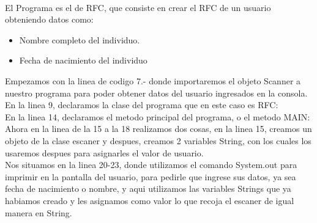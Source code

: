 \documentclass{report}%
\begin{document}
\\
{\small
El Programa es el de RFC, que consiste en crear el RFC de un usuario obteniendo datos como:\\
\begin{itemize}
  \item Nombre completo del individuo.
  \item Fecha de nacimiento del individuo
\end{itemize}

Empezamos con la linea de codigo 7.- donde importaremos el objeto Scanner a nuestro programa para poder obtener datos del usuario ingresados en la consola.\\


En la linea 9, declaramos la clase del programa que en este caso es RFC:\\


En la linea 14, declaramos el metodo principal del programa, o el metodo MAIN:\\



Ahora en la linea de la 15 a la 18 realizamos dos cosas, en la linea 15, creamos un objeto de la clase escaner y despues, creamos 2 variables String, con los cuales los usaremos despues para asignarles el valor de usuario.\\


Nos situamos en la linea 20-23, donde utilizamos el comando System.out para imprimir en la pantalla del usuario, para pedirle que ingrese sus datos, ya sea fecha de nacimiento o nombre, y aqui utilizamos las variables Strings que ya habiamos creado y les asignamos como valor lo que recoja el escaner de igual manera en String.\\


}
\end{document}

